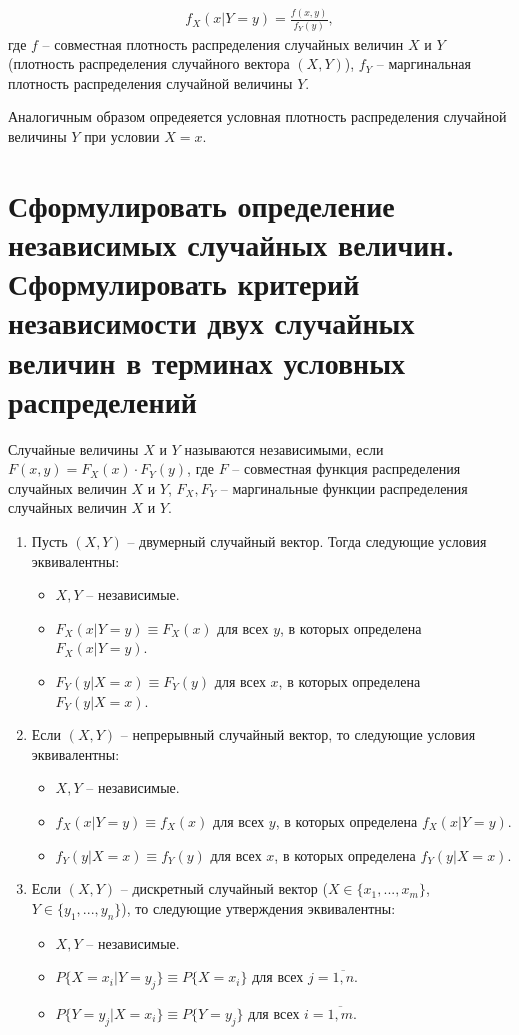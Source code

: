 \begin{align*}
	f_X(x|Y=y) = \frac{f(x, y)}{f_Y(y)},
\end{align*}
где $f$ -- совместная плотность распределения случайных величин $X$ и $Y$ (плотность распределения случайного вектора $(X, Y)$), $f_Y$ -- маргинальная плотность распределения случайной величины $Y$.

Аналогичным образом опредеяется условная плотность распределения случайной величины $Y$ при условии $X = x$.

\section{Сформулировать определение независимых случайных величин. Сформулировать критерий независимости двух случайных величин в терминах условных распределений}

Случайные величины $X$ и $Y$ называются независимыми, если $F(x, y) = F_X(x) \cdot F_Y(y)$, где $F$ -- совместная функция распределения случайных величин $X$ и $Y$, $F_X, F_Y$ -- маргинальные функции распределения случайных величин $X$ и $Y$.

\begin{enumerate}
	
	\item Пусть $(X, Y)$ -- двумерный случайный вектор. Тогда следующие условия эквивалентны: 
	
	\begin{itemize}
		\item $X, Y$ -- независимые.
		\item $F_X(x | Y=y) \equiv F_X(x)$ для всех $y$, в которых определена $F_X(x|Y=y)$.
		\item $F_Y(y | X=x) \equiv F_Y(y)$ для всех $x$, в которых определена $F_Y(y|X=x)$.
	\end{itemize}
	\item Если $(X, Y)$ -- непрерывный случайный вектор, то следующие условия эквивалентны: 
	\begin{itemize}
		\item $X, Y$ -- независимые.
		\item $f_X(x | Y=y) \equiv f_X(x)$ для всех $y$, в которых определена $f_X(x|Y=y)$.
		\item $f_Y(y | X=x) \equiv f_Y(y)$ для всех $x$, в которых определена $f_Y(y|X=x)$.
	\end{itemize}
	\item Если $(X, Y)$ -- дискретный случайный вектор ($X \in \{x_1, ..., x_m\}$, $Y \in \{y_1, ..., y_n\}$), то следующие утверждения эквивалентны:
	\begin{itemize}
		\item $X, Y$ -- независимые.
		\item $P\{X=x_i | Y=y_j\} \equiv P\{X=x_i\}$ для всех $j=\overline{1, n}$.
		\item $P\{Y=y_j | X=x_i\} \equiv P\{Y=y_j\}$ для всех $i=\overline{1, m}$.
	\end{itemize}
\end{enumerate}

